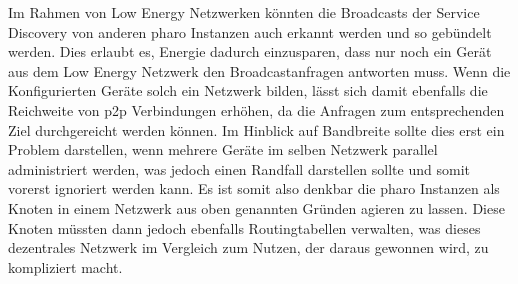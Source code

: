 	Im Rahmen von Low Energy Netzwerken könnten die Broadcasts der Service Discovery von anderen pharo Instanzen auch erkannt werden und so gebündelt werden. Dies erlaubt es, Energie dadurch einzusparen, dass nur noch ein Gerät aus dem Low Energy Netzwerk den Broadcastanfragen antworten muss. Wenn die Konfigurierten Geräte solch ein Netzwerk bilden, lässt sich damit ebenfalls die Reichweite von p2p Verbindungen erhöhen, da die Anfragen zum entsprechenden Ziel durchgereicht werden können. Im Hinblick auf Bandbreite sollte dies erst ein Problem darstellen, wenn mehrere Geräte im selben Netzwerk parallel administriert werden, was jedoch einen Randfall darstellen sollte und somit vorerst ignoriert werden kann. Es ist somit also denkbar die pharo Instanzen als Knoten in einem Netzwerk aus oben genannten Gründen agieren zu lassen. Diese Knoten müssten dann jedoch ebenfalls Routingtabellen verwalten, was dieses dezentrales Netzwerk im Vergleich zum Nutzen, der daraus gewonnen wird, zu kompliziert macht.
	
	
